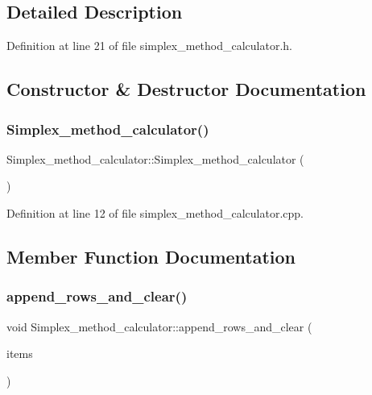 \subsection{Detailed Description}


Definition at line 21 of file simplex\+\_\+method\+\_\+calculator.\+h.



\subsection{Constructor \& Destructor Documentation}
\mbox{\label{classSimplex__method__calculator_acf752aa35f11c00914e09e66818e178c}} 
\subsubsection{\texorpdfstring{Simplex\+\_\+method\+\_\+calculator()}{Simplex\_method\_calculator()}}
{\footnotesize\ttfamily Simplex\+\_\+method\+\_\+calculator\+::\+Simplex\+\_\+method\+\_\+calculator (\begin{DoxyParamCaption}{ }\end{DoxyParamCaption})}



Definition at line 12 of file simplex\+\_\+method\+\_\+calculator.\+cpp.



\subsection{Member Function Documentation}
\mbox{\label{classSimplex__method__calculator_abd739936d71ced59dd0f76c100fbad48}} 
\subsubsection{\texorpdfstring{append\+\_\+rows\+\_\+and\+\_\+clear()}{append\_rows\_and\_clear()}}
{\footnotesize\ttfamily void Simplex\+\_\+method\+\_\+calculator\+::append\+\_\+rows\+\_\+and\+\_\+clear (\begin{DoxyParamCaption}\item[{Q\+List$<$ Q\+Standard\+Item $\ast$$>$}]{items }\end{DoxyParamCaption})\hspace{0.3cm}{\ttfamily [private]}}



